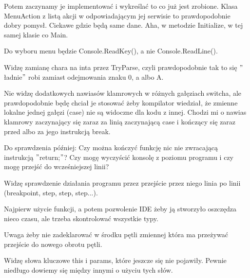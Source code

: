 \documentclass[10pt]{article}
\begin{document}
Potem zaczynamy je implementować i wykreślać to co już jest zrobione. Klasa MenuAction z listą akcji w odpowiadającym jej serwisie to prawdopodobnie dobry pomysł. Ciekawe gdzie będą same dane. Aha, w metodzie Initialize, w tej samej klasie co Main.

Do wyboru menu będzie Console.ReadKey(), a nie Console.ReadLine().

Widzę zamianę chara na inta przez TryParse, czyli prawdopodobnie tak to się $"$ładnie$"$ robi zamiast odejmowania znaku 0, a albo A.

Nie widzę dodatkowych nawiasów klamrowych w różnych gałęziach switcha, ale prawdopodobnie będę chciał je stosować żeby kompilator wiedział, że zmienne lokalne jednej gałęzi (case) nie są widoczne dla kodu z innej. Chodzi mi o nawias klamrowy zaczynający się zaraz za linią zaczynającą case i kończący się zaraz przed albo za jego instrukcją break.

Do sprawdzenia później: Czy można kończyć funkcję nic nie zwracającą instrukcją $"$return;$"$? Czy mogę wyczyścić konsolę z poziomu programu i czy mogę przejść do wcześniejszej linii?

Widzę sprawdzenie działania programu przez przejście przez niego linia po linii (breakpoint, step, step, step...).

Najpierw użycie funkcji, a potem pozwolenie IDE żeby ją stworzyło oszczędza nieco czasu, ale trzeba skontrolować wszystkie typy.

Uwaga żeby nie zadeklarować w środku pętli zmiennej która ma przeżywać przejście do nowego obrotu pętli.

Widzę słowa kluczowe this i params, które jeszcze się nie pojawiły. Pewnie niedługo dowiemy się między innymi o użyciu tych słów.
\end{document}

